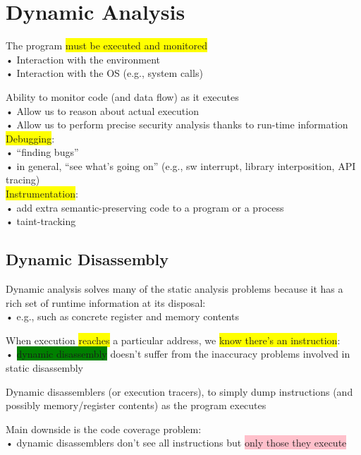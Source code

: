 \documentclass[]{project_plan}
\begin{document}
\section{Dynamic Analysis}

The program \colorbox{yellow}{must be executed and monitored}\\
• Interaction with the environment\\
• Interaction with the OS (e.g., system calls)

Ability to monitor code (and data flow) as it executes\\
• Allow us to reason about actual execution\\
• Allow us to perform precise security analysis thanks to run-time information\\

\colorbox{yellow}{Debugging}:\\
• “finding bugs”\\
• in general, “see what’s going on” (e.g., sw interrupt, library interposition, API tracing)\\

\colorbox{yellow}{Instrumentation}:\\
• add extra semantic-preserving code to a program or a process\\
• taint-tracking

\subsection{Dynamic Disassembly}

Dynamic analysis solves many of the static analysis problems because it has a rich set
of runtime information at its disposal:\\
• e.g., such as concrete register and memory contents

When execution \colorbox{yellow}{reaches} a particular address, we \colorbox{yellow}{know there’s an instruction}:\\
• \colorbox{green}{dynamic disassembly} doesn’t suffer from the inaccuracy problems involved in static
disassembly

Dynamic disassemblers (or execution tracers), to simply dump instructions (and
possibly memory/register contents) as the program executes

Main downside is the code coverage problem:\\
• dynamic disassemblers don’t see all instructions but \colorbox{pink}{only those they execute}
\end{document}
